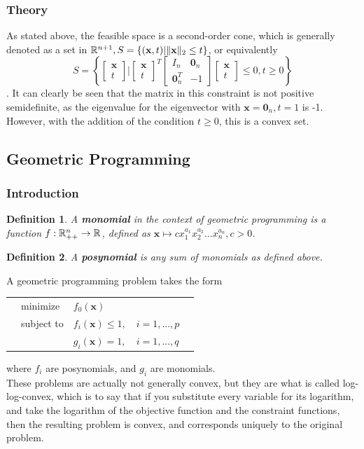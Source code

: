 \documentclass[10pt]{article}
\renewcommand{\vec}[1]{\mathbf{#1}}
\newcommand{\R}[1][]{ \ifx&#1& \mathbb{R} \else \mathbb{R}^{#1} \fi }
\newcommand{\x}{\vec{x}}
\newcommand{\vz}[1]{\vec{0}_{#1}}
\newtheorem*{definition}{Definition}
\begin{document}
\subsubsection{Theory}
As stated above, the feasible space is a second-order cone, which is generally denoted as a set in $\R[n+1], S = \{(\x,t)|\lVert\x\rVert_2\leq t\}$, or equivalently \[ S=\left\{\begin{bmatrix}\x\\t\end{bmatrix}| \begin{bmatrix}\x\\t\end{bmatrix}^T\begin{bmatrix}I_n & \vz{n}\\\vz{n}^T & -1\end{bmatrix}\begin{bmatrix}\x\\t\end{bmatrix}\leq 0, t\geq 0\right\}\]\cite{boyd}. It can clearly be seen that the matrix in this constraint is not positive semidefinite, as the eigenvalue for the eigenvector with $\x=\vz{n},t=1$ is -1. However, with the addition of the condition $t\geq 0$, this is a convex set. \cite{boyd}
\subsection{Geometric Programming}
\subsubsection{Introduction}
\begin{definition}
	A \textbf{monomial} in the context of geometric programming is a function $f:\R[n]_{++}\to\R$, defined as $\x\mapsto cx_1^{a_1}x_2^{a_2}...x_n^{a_n}, c>0$.
\end{definition}
\begin{definition}
	A \textbf{posynomial} is any sum of monomials as defined above.
\end{definition}
A geometric programming problem takes the form \\
\begin{tabularx}{\textwidth}{X l l l X}
	& minimize		& $f_0(\x)$ & & \\
	& subject to	& $f_i(\x) \leq 1,$ & $i=1,...,p$ &\\
	& 				& $g_i(\x) = 1,$ & $i=1,...,q$ & 
\end{tabularx}
where $f_i$ are posynomials, and $g_i$ are monomials.\cite{duffin}\cite{boyd-gp} \\
These problems are actually not generally convex, but they are what is called log-log-convex\cite{boyd-dgp}, which is to say that if you substitute every variable for its logarithm, and take the logarithm of the objective function and the constraint functions, then the resulting problem is convex, and corresponds uniquely to the original problem.
\end{document}
